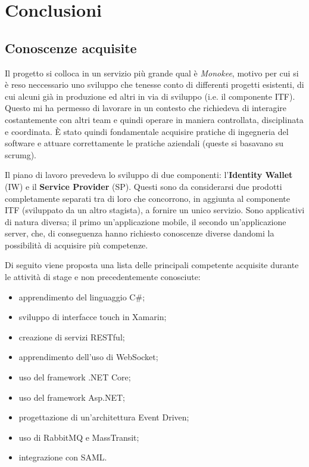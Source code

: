 
\chapter{Conclusioni}
\label{cap:conclusioni}


\section{Conoscenze acquisite}
Il progetto si colloca in un servizio più grande qual è \emph{Monokee}, motivo per cui si è reso neccessario uno sviluppo che tenesse conto di differenti progetti esistenti, di cui alcuni già in produzione ed altri in via di sviluppo (i.e. il componente ITF). Questo mi ha permesso di lavorare in un contesto che richiedeva di interagire costantemente con altri team e quindi operare in maniera controllata, disciplinata e coordinata. È stato quindi fondamentale acquisire pratiche di ingegneria del software e attuare correttamente le pratiche aziendali (queste si basavano su \gls{scrumg}).

Il piano di lavoro prevedeva lo sviluppo di due componenti: l'\textbf{Identity Wallet} (IW) e il \textbf{Service Provider} (SP). Questi sono da considerarsi due prodotti completamente separati tra di loro che concorrono, in aggiunta al componente ITF (sviluppato da un altro stagista), a fornire un unico servizio. Sono applicativi di natura diversa; il primo un'applicazione mobile, il secondo un'applicazione server, che, di conseguenza hanno richiesto conoscenze diverse dandomi la possibilità di acquisire più competenze.

Di seguito viene proposta una lista delle principali competente acquisite durante le attività di stage e non precedentemente conosciute:
\begin{itemize}
    \item apprendimento del linguaggio C\#;
    \item sviluppo di interfacce touch in Xamarin;
    \item creazione di servizi RESTful;
    \item apprendimento dell'uso di WebSocket;
    \item uso del framework .NET Core;
    \item uso del framework  Asp.NET;
    \item progettazione di un'architettura Event Driven;
    \item uso di RabbitMQ e MassTransit;
    \item integrazione con SAML.
\end{itemize}

